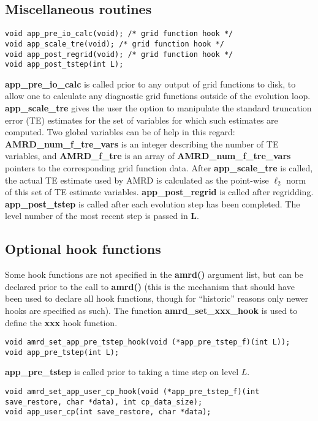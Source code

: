 \documentclass[aps,amssymb,unsortedaddress,nofootinbib]{revtex4}
\begin{document}
\subsection{Miscellaneous routines}

\begin{verbatim}
void app_pre_io_calc(void); /* grid function hook */
void app_scale_tre(void); /* grid function hook */
void app_post_regrid(void); /* grid function hook */
void app_post_tstep(int L); 
\end{verbatim}

{\bf app\_pre\_io\_calc} is called prior to any output of grid functions to
disk, to allow one to calculate any diagnostic grid functions outside of the
evolution loop. {\bf app\_scale\_tre} gives the user the option to manipulate
the standard truncation error (TE) estimates for the
set of variables for which such estimates are computed. Two global variables
can be of help in this regard: {\bf AMRD\_num\_f\_tre\_vars} is an integer
describing the number of TE variables, and {\bf AMRD\_f\_tre} is an array of
{\bf AMRD\_num\_f\_tre\_vars} pointers to the corresponding grid function data.
After {\bf app\_scale\_tre} is called, the actual TE estimate used by AMRD
is calculated as the point-wise $\ell_2$ norm of this set of TE estimate variables.
{\bf app\_post\_regrid} is called after regridding. 
{\bf app\_post\_tstep} is called after each evolution
step has been completed. The level number of the most recent step is passed
in {\bf L}.

\subsection{Optional hook functions}\label{sec_op_hooks}
Some hook functions are not specified in the {\bf amrd()} 
argument list, but can be declared prior to the call to {\bf amrd()} 
(this is the mechanism that should have been used to declare all hook
functions, though for ``historic'' reasons only newer hooks are specified
as such). The function {\bf amrd\_set\_xxx\_hook} is used
to define the {\bf xxx} hook function.

\begin{verbatim}
void amrd_set_app_pre_tstep_hook(void (*app_pre_tstep_f)(int L));
void app_pre_tstep(int L);
\end{verbatim}

{\bf app\_pre\_tstep} is called prior to taking a time step on level $L$.

\begin{verbatim}
void amrd_set_app_user_cp_hook(void (*app_pre_tstep_f)(int save_restore, char *data), int cp_data_size);
void app_user_cp(int save_restore, char *data);
\end{verbatim}
\end{document}
